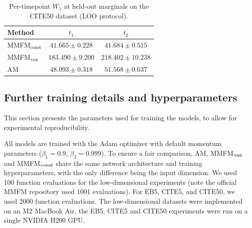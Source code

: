 \documentclass[12pt]{article}
\theoremstyle{plain}
\theoremstyle{plain}
\theoremstyle{remark}
\newcommand{\1}{\bm{1}}
\theoremstyle{plain}
\theoremstyle{definition}
\theoremstyle{remark}
\begin{document}
\begin{table}[t]
\centering
\caption{Per-timepoint $W_1$ at held-out marginals on the CITE50 dataset (LOO protocol).}
\label{tab:cite50-holdout}
\begin{tabular}{lcc}
Method & $t_1$ & $t_2$ \\
\midrule
MMFM$_{\mathrm{const}}$ & $41.665 \pm 0.228$ & $41.684 \pm 0.515$ \\
MMFM$_{\mathrm{van}}$   & $183.490 \pm 9.200$ & $218.402 \pm 10.238$ \\
AM & $48.093 \pm 0.318$ & $51.568 \pm 0.637$ \\
\end{tabular}
\end{table}









\clearpage
\newpage
\subsection{Further training details and hyperparameters}\label{app:training_details}
This section presents the parameters used for training the models, to allow for experimental reproducibility.

All models are trained with the Adam optimizer \citep{kingma2015adam} with default momentum parameters ($\beta_1 = 0.9$, $\beta_2 = 0.999$). To ensure a fair comparison, AM, MMFM$_{\rm van}$ and MMFM$_{\rm const}$ share the same network architecture and training hyperparameters, with the only difference being the input dimension. We used 100 function evaluations for the low-dimensional experiments (note the official MMFM repository used 1001 evaluations). For EB5, CITE5, and CITE50, we used 2000 function evaluations. The low-dimensional datasets were implemented on an M2 MacBook Air, the EB5, CITE5 and CITE50 experiments were run on a single NVIDIA H200 GPU.



\begin{table}[h]
\centering
\small
\setlength{\tabcolsep}{5pt}
\caption{Main hyperparameters for training the conditional Gaussian sampler.}
\label{tab:params-conditional-sampler}
\end{table}
\end{document}
